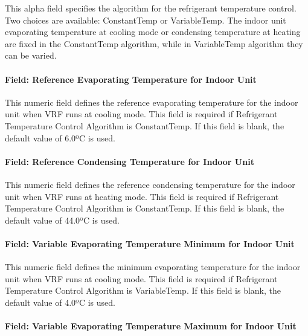 This alpha field specifies the algorithm for the refrigerant temperature control. Two choices are available: ConstantTemp or VariableTemp. The indoor unit evaporating temperature at cooling mode or condensing temperature at heating are fixed in the ConstantTemp algorithm, while in VariableTemp algorithm they can be varied.

\paragraph{Field: Reference Evaporating Temperature for Indoor Unit}\label{field-reference-evaporating-temperature-for-indoor-unit}

This numeric field defines the reference evaporating temperature for the indoor unit when VRF runs at cooling mode. This field is required if Refrigerant Temperature Control Algorithm is ConstantTemp. If this field is blank, the default value of 6.0ºC is used.

\paragraph{Field: Reference Condensing Temperature for Indoor Unit}\label{field-reference-condensing-temperature-for-indoor-unit}

This numeric field defines the reference condensing temperature for the indoor unit when VRF runs at heating mode. This field is required if Refrigerant Temperature Control Algorithm is ConstantTemp. If this field is blank, the default value of 44.0ºC is used.

\paragraph{Field: Variable Evaporating Temperature Minimum for Indoor Unit}\label{field-variable-evaporating-temperature-minimum-for-indoor-unit}

This numeric field defines the minimum evaporating temperature for the indoor unit when VRF runs at cooling mode. This field is required if Refrigerant Temperature Control Algorithm is VariableTemp. If this field is blank, the default value of 4.0ºC is used.

\paragraph{Field: Variable Evaporating Temperature Maximum for Indoor Unit}\label{field-variable-evaporating-temperature-maximum-for-indoor-unit}

